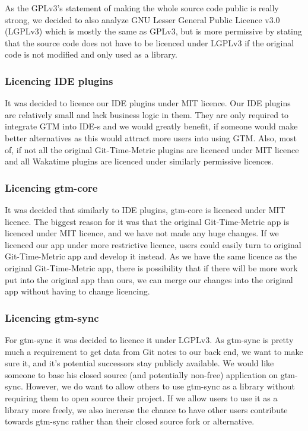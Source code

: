 As the GPLv3's statement of making the whole source code public is really strong, we decided to also analyze
GNU Lesser General Public Licence v3.0 (LGPLv3) which is mostly the same as GPLv3, but is more permissive by
stating that the source code does not have to be licenced under LGPLv3 if the original code is not modified and only used as a library.
\cite{lgplv3-licence}

\subsubsection{Licencing IDE plugins}\label{subsubsec:licencing-ide-plugins}
It was decided to licence our IDE plugins under MIT licence.
Our IDE plugins are relatively small and lack business logic in them.
They are only required to integrate GTM into IDE-s and we would greatly benefit, if someone would make better alternatives
as this would attract more users into using GTM.
Also, most of, if not all the original Git-Time-Metric plugins are licenced under MIT licence and all Wakatime plugins are
licenced under similarly permissive licences.

\subsubsection{Licencing gtm-core}\label{subsubsec:licencing-gtm-core}
It was decided that similarly to IDE plugins, gtm-core is licenced under MIT licence.
The biggest reason for it was that the original Git-Time-Metric app is licenced under MIT licence, and we have not made any huge changes.
If we licenced our app under more restrictive licence, users could easily turn to original Git-Time-Metric app and develop it instead.
As we have the same licence as the original Git-Time-Metric app, there is possibility that if there will be more work put into the
original app than ours, we can merge our changes into the original app without having to change licencing.

\subsubsection{Licencing gtm-sync}\label{subsubsec:licencing-gtm-sync}
For gtm-sync it was decided to licence it under LGPLv3.
As gtm-sync is pretty much a requirement to get data from Git notes to our back end, we want to make sure it,
and it's potential successors stay publicly available.
We would like someone to base his closed source (and potentially non-free) application on gtm-sync.
However, we do want to allow others to use gtm-sync as a library without requiring them to open source their project.
If we allow users to use it as a library more freely, we also increase the chance to have other users contribute towards gtm-sync
rather than their closed source fork or alternative.

